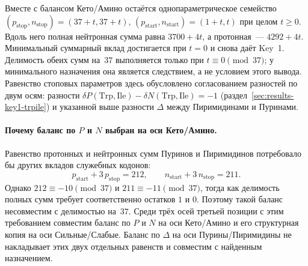 \documentclass[11pt,a4paper]{article}
\renewcommand{\_}{\origunderscore\allowbreak}
\begin{document}
Вместе с балансом Кето/Амино остаётся однопараметрическое семейство
$(p_{\text{stop}},n_{\text{stop}})=(37+t,37+t)$,
$(p_{\text{start}},n_{\text{start}})=(1+t,t)$ при целом $t\ge0$.
Вдоль него полная нейтронная сумма равна $3700+4t$,
а протонная~--- $4292+4t$. Минимальный суммарный вклад
достигается при $t=0$ и снова даёт Key~1.
Делимость обеих сумм на~$37$ выполняется только при
$t\equiv0\pmod{37}$; у минимального назначения она
является следствием, а не условием этого вывода.
Равенство стоповых параметров здесь обусловлено
согласованием разностей по двум осям: разности
$\delta P(\mathrm{Trp},\mathrm{Ile})-
\delta N(\mathrm{Trp},\mathrm{Ile})=-1$
(раздел~\ref{sec:results-key1-trpile}) и указанной выше
разности $\Delta$ между Пиримидинами и Пуринами.

\paragraph{Почему баланс по $P$ и $N$ выбран на оси Кето/Амино.}
Равенство протонных и нейтронных сумм Пуринов и Пиримидинов
потребовало бы других вкладов служебных кодонов:
\[
p_{\text{start}}+3\,p_{\text{stop}}=212,
\qquad n_{\text{start}}+3\,n_{\text{stop}}=211.
\]
Однако $212\equiv-10\pmod{37}$ и
$211\equiv-11\pmod{37}$, тогда как делимость полных сумм
требует соответственно остатков $1$ и $0$.
Поэтому такой баланс несовместим с делимостью на~$37$.
Среди трёх осей третьей позиции с этим требованием совместим
баланс по $P$ и $N$ на оси Кето/Амино и его структурная
копия на оси Сильные/Слабые. Баланс по $\Delta$ на оси
Пурины/Пиримидины не накладывает этих двух отдельных
равенств и совместим с найденным назначением.
\end{document}
